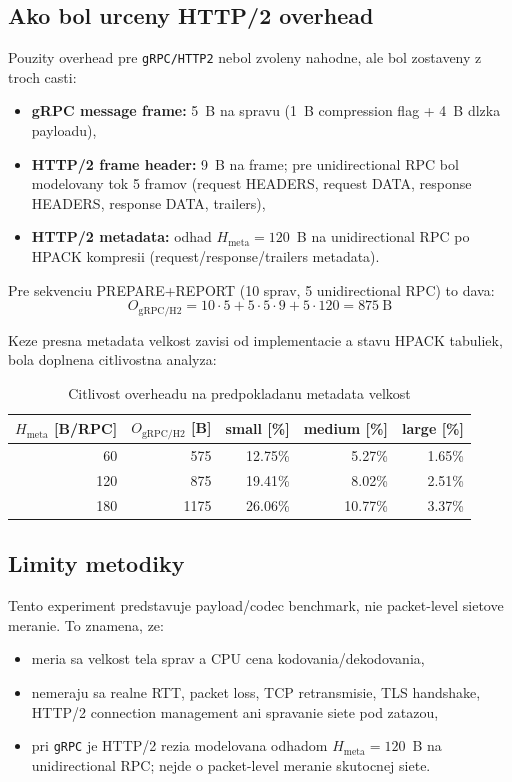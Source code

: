 \documentclass[12pt,a4paper]{report}
\begin{document}
\subsection{Ako bol urceny HTTP/2 overhead}

Pouzity overhead pre \texttt{gRPC/HTTP2} nebol zvoleny nahodne, ale bol
zostaveny z troch casti:
\begin{itemize}
  \item \textbf{gRPC message frame:} 5~B na spravu (1~B compression flag +
  4~B dlzka payloadu),
  \item \textbf{HTTP/2 frame header:} 9~B na frame; pre unidirectional RPC bol
  modelovany tok 5 framov
  (request HEADERS, request DATA, response HEADERS, response DATA, trailers),
  \item \textbf{HTTP/2 metadata:} odhad $H_{\text{meta}}=120$~B na unidirectional RPC
  po HPACK kompresii (request/response/trailers metadata).
\end{itemize}

Pre sekvenciu PREPARE+REPORT (10 sprav, 5 unidirectional RPC) to dava:
\begin{equation}
O_{\text{gRPC/H2}} = 10\cdot5 + 5\cdot5\cdot9 + 5\cdot120 = 875~\text{B}
\end{equation}

Keze presna metadata velkost zavisi od implementacie a stavu HPACK tabuliek,
bola doplnena citlivostna analyza:
\begin{table}[htbp]
\centering
\caption{Citlivost overheadu na predpokladanu metadata velkost}
\label{tab:grpc-http2-metadata-sensitivity}
\begin{tabular}{|r|r|r|r|r|}
\hline
$H_{\text{meta}}$ [B/RPC] & $O_{\text{gRPC/H2}}$ [B] & small [\%] & medium [\%] & large [\%] \\
\hline
60  & 575  & 12.75\% & 5.27\% & 1.65\% \\
120 & 875  & 19.41\% & 8.02\% & 2.51\% \\
180 & 1175 & 26.06\% & 10.77\% & 3.37\% \\
\hline
\end{tabular}
\end{table}

\subsection{Limity metodiky}

Tento experiment predstavuje payload/codec benchmark, nie packet-level
sietove meranie. To znamena, ze:
\begin{itemize}
  \item meria sa velkost tela sprav a CPU cena kodovania/dekodovania,
  \item nemeraju sa realne RTT, packet loss, TCP retransmisie, TLS handshake,
  HTTP/2 connection management ani spravanie siete pod zatazou,
  \item pri \texttt{gRPC} je HTTP/2 rezia modelovana odhadom
  $H_{\text{meta}}=120$~B na unidirectional RPC; nejde o packet-level meranie
  skutocnej siete.
\end{itemize}
\end{document}

